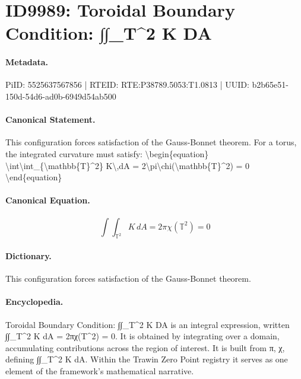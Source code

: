 \section*{ID9989: Toroidal Boundary Condition: ∫∫\_T\textasciicircum{}2 K DA}
\paragraph{Metadata.}
PiID: 5525637567856 | RTEID: RTE:P38789.5053:T1.0813 | UUID: b2b65e51-150d-54d6-ad0b-6949d54ab500

\paragraph{Canonical Statement.}
This configuration forces satisfaction of the Gauss-Bonnet theorem. For a torus, the integrated curvature must satisfy: \textbackslash{}begin\{equation\} \textbackslash{}int\textbackslash{}int\_\{\textbackslash{}mathbb\{T\}\textasciicircum{}2\} K\textbackslash{},dA = 2\textbackslash{}pi\textbackslash{}chi(\textbackslash{}mathbb\{T\}\textasciicircum{}2) = 0 \textbackslash{}end\{equation\}

\paragraph{Canonical Equation.}
\[
\int\int_{\mathbb{T}^2} K\,dA = 2\pi\chi(\mathbb{T}^2) = 0
\]

\paragraph{Dictionary.}
This configuration forces satisfaction of the Gauss-Bonnet theorem.

\paragraph{Encyclopedia.}
Toroidal Boundary Condition: ∫∫\_T\textasciicircum{}2 K DA is an integral expression, written ∫∫\_T\textasciicircum{}2 K dA = 2πχ(T\textasciicircum{}2) = 0. It is obtained by integrating over a domain, accumulating contributions across the region of interest. It is built from π, χ, defining ∫∫\_T\textasciicircum{}2 K dA. Within the Trawin Zero Point registry it serves as one element of the framework's mathematical narrative.
